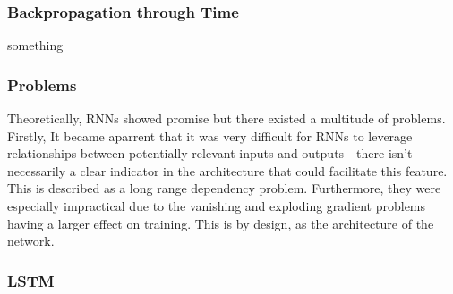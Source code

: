 \documentclass[12pt,twoside]{report}
\begin{document}
\subsubsection{Backpropagation through Time}
	something

\subsubsection{Problems}

Theoretically, RNNs showed promise but there existed a multitude of problems. Firstly, It became aparrent that it was very difficult for RNNs to leverage relationships between potentially relevant inputs and outputs - there isn't necessarily a clear indicator in the architecture that could facilitate this feature. This is described as a long range dependency problem. Furthermore, they were especially impractical due to the vanishing and exploding gradient problems having a larger effect on training. This is by design, as the architecture of the network.

\subsubsection{LSTM}
\end{document}
